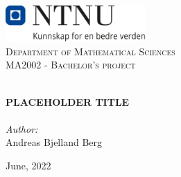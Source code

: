 
\begin{titlepage}
\vbox{ }
\vbox{ }
\begin{center}
\includegraphics[width=0.40\textwidth]{Images/NTNU_logo.png}\\[1cm]
\textsc{\LARGE Department of Mathematical Sciences}\\[1.5cm]
\textsc{\Large MA2002 - Bachelor's project}\\[0.5cm]
\vbox{ }

\HRule \\[0.4cm]
{ \huge \bfseries \color{red}PLACEHOLDER TITLE}\\[0.4cm]
\HRule \\[1.5cm]

\large
\emph{Author:}\\
Andreas Bjelland Berg


\vfill

{\large June, 2022}
\end{center}
\end{titlepage}